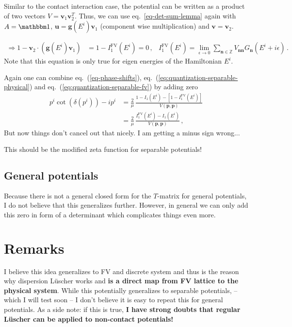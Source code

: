 \documentclass[
    aps,
    prl,
    showkeys,
    nofootinbib,
    floatfix
]{revtex4}
\renewcommand{\vec}[1]{\boldsymbol{#1}}
\begin{document}
Similar to the contact interaction case, the potential can be written as a product of two vectors $V = \vec v_1 \vec v_2^T$.
Thus, we can use eq.~\ref{eq-det-sum-lemma} again with $A = \mathbbm 1$, $\vec u = \vec g(E^i) \vec v_1$ (component wise multiplication) and $\vec v = \vec v_2$.

\begin{align}\label{eq:quantization-separable-fv}
	\Rightarrow
	1 - \vec v_2 \cdot ( \vec g(E^i) \vec v_1) &= 1 - I_1^{\mathrm{FV}}(E^i) = 0 \, , &
	I_1^{\mathrm{FV}}(E^i) = \lim\limits_{\epsilon \to 0}\sum\limits_{\vec n \in \mathbb Z} V_{\vec n \vec n}G_{\vec n}(E^i + i \epsilon) \, .
\end{align}
Note that this equation is only true for eigen energies of the Hamiltonian $E^i$.

Again one can combine eq.~(\ref{eq-phase-shifts}), eq.~(\ref{eq:quantization-separable-physical}) and eq.~(\ref{eq:quantization-separable-fv}) by adding zero
\begin{align}
	p^i \cot(\delta(p^i)) -i p^i 
	&= 
	\frac{2}{\mu} \, \frac{1 - I_1(E^i) - \left[ 1 - I_1^{\mathrm{FV}}(E^i) \right]}{V(\vec p, \vec p)}
	\\ &=
	\frac{2}{\mu} \, \frac{I_1^{\mathrm{FV}}(E^i) - I_1(E^i)}{V(\vec p, \vec p)}
	\, ,
\end{align}
But now things don't cancel out that nicely.
{\color{red} I am getting a minus sign wrong...}

This should be the modified zeta function for separable potentials!

\subsection{General potentials}
Because there is not a general closed form for the $T$-matrix for general potentials, I do not believe that this generalizes further.
However, in general we can only add this zero in form of a determinant which complicates things even more.

\section{Remarks}
I believe this idea generalizes to FV and discrete system and thus is the reason why dispersion Lüscher works and \textbf{is a direct map from FV lattice to the physical system}.
While this potentially generalizes to separable potentials, -- which I will test soon -- I don't believe it is easy to repeat this for general potentials.
As a side note: if this is true, \textbf{I have strong doubts that regular Lüscher can be applied to non-contact potentials!}
\end{document}
